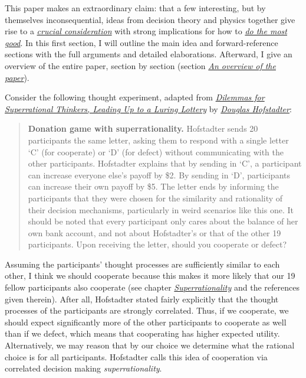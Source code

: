 This paper makes an extraordinary claim: that a few interesting, but by
themselves inconsequential, ideas from decision theory and physics
together give rise to a
\href{https://concepts.effectivealtruism.org/concepts/the-importance-of-crucial-considerations/}{\emph{crucial
consideration}} with strong implications for how to
\href{https://en.wikipedia.org/wiki/Effective_altruism}{\emph{do the
most good}}. In this first section, I will outline the main idea and
forward-reference sections with the full arguments and detailed
elaborations. Afterward, I give an overview of the entire paper, section
by section (section
\protect\hyperlink{an-overview-of-the-paper}{\emph{An overview of the
paper}}).

Consider the following thought experiment, adapted from
\href{https://www.gwern.net/docs/1985-hofstadter\#dilemmas-for-superrational-thinkers-leading-up-to-a-luring-lottery}{\emph{\emph{Dilemmas
for Superrational Thinkers, Leading Up to a Luring Lottery}}} by
\href{https://en.wikipedia.org/wiki/Douglas_Hofstadter}{\emph{Douglas
Hofstadter}}:

\begin{quote}
\textbf{Donation game with superrationality.} Hofstadter sends 20
participants the same letter, asking them to respond with a single
letter `C' (for cooperate) or `D' (for defect) without communicating
with the other participants. Hofstadter explains that by sending in `C',
a participant can increase everyone else's payoff by \$2. By sending in
`D', participants can increase their own payoff by \$5. The letter ends
by informing the participants that they were chosen for the similarity
and rationality of their decision mechanisms, particularly in weird
scenarios like this one. It should be noted that every participant only
cares about the balance of her own bank account, and not about
Hofstadter's or that of the other 19 participants. Upon receiving the
letter, should you cooperate or defect?
\end{quote}

Assuming the participants' thought processes are sufficiently similar to
each other, I think we should cooperate because this makes it more
likely that our 19 fellow participants also cooperate (see chapter
\protect\hyperlink{superrationality}{\emph{Superrationality}} and
the references given therein). After all, Hofstadter stated fairly
explicitly that the thought processes of the participants are strongly
correlated. Thus, if we cooperate, we should expect significantly more
of the other participants to cooperate as well than if we defect, which
means that cooperating has higher expected utility. Alternatively, we
may reason that by our choice we determine what the rational choice is
for all participants. Hofstadter calls this idea of cooperation via
correlated decision making \emph{superrationality}.

